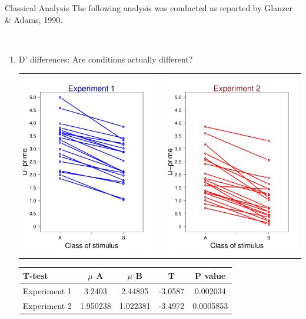 \documentclass[final]{beamer}
\newlength{\onecolwid}
\newlength{\twocolwid}
\begin{document}
\begin{frame}[t]
\begin{columns}[t]
\begin{column}{\twocolwid}
\begin{columns}[t,totalwidth=\twocolwid]
\begin{column}{\onecolwid}
\begin{alertblock}{Classical Analysis}
The following analysis was conducted as reported by Glanzer \& Adams, 1990.

$\qquad$

\begin{enumerate}
\item D' differences: Are conditions actually different?
\begin{center}
\begin{tabular}{ccc}
\includegraphics[width=0.3\linewidth]{Figures/An_Diff_D_1.pdf} & \hfill & \includegraphics[width=0.3\linewidth]{Figures/An_Diff_D_2.pdf}
\end{tabular}
\end{center}
\begin{table}
\vspace{2ex}
\begin{tabular}{l | c c c c}
\toprule
\textbf{T-test} & \textbf{$\mu$ A} & \textbf{$\mu$ B} & \textbf{T}  & \textbf{P value}\\
\midrule
Experiment 1 & 3.2403 & 2.44895 & -3.0587 & 0.002034 \\
Experiment 2 & 1.950238 & 1.022381 & -3.4972 & 0.0005853 \\
\bottomrule
\end{tabular}
\end{table}

$\qquad$



\end{enumerate}
\end{alertblock}
\end{column}
\end{columns}
\end{column}
\end{columns}
\end{frame}
\end{document}
